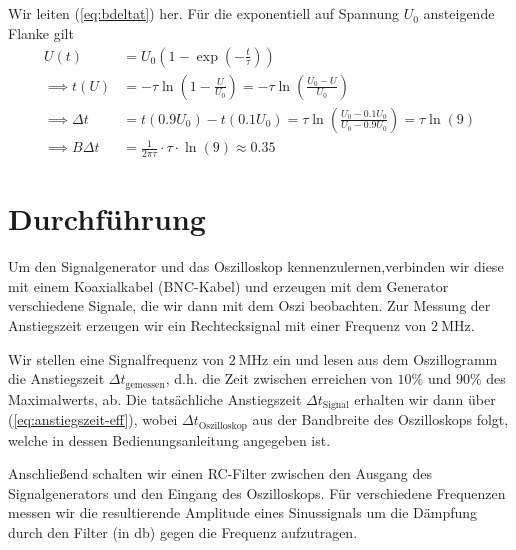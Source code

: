 \documentclass{article}
\begin{document}
\subsection{}
Wir leiten (\ref{eq:bdeltat}) her. Für die exponentiell auf Spannung $U_0$ ansteigende Flanke gilt
\begin{align*}
  U(t) &= U_0 \left(1 - \exp(-\frac{t}{\tau})\right) \\
  \implies t(U) &= -\tau \ln\left(1 - \frac{U}{U_0}\right) = -\tau \ln\left(\frac{U_0-U}{U_0}\right) \\
  \implies \Delta t &= t(0.9 U_0) - t(0.1 U_0) = \tau \ln\left(\frac{U_0-0.1U_0}{U_0-0.9U_0}\right) = \tau \ln(9) \\
  \implies B \Delta t &= \frac{1}{2\pi\tau} \cdot \tau \cdot \ln(9) \approx 0.35
\end{align*}


\endgroup
\section{Durchführung}
Um den Signalgenerator und das Oszilloskop kennenzulernen,verbinden wir diese mit einem Koaxialkabel (BNC-Kabel) und erzeugen mit dem Generator verschiedene Signale, die wir dann mit dem Oszi beobachten.
Zur Messung der Anstiegszeit erzeugen wir ein Rechtecksignal mit einer Frequenz von $\SI{2}{\mega\hertz}$.


Wir stellen eine Signalfrequenz von $\SI{2}{\mega\hertz}$ ein
und lesen aus dem Oszillogramm die Anstiegszeit $\Delta t_\text{gemessen}$, d.h. die Zeit zwischen erreichen von $10\%$ und $90\%$
des Maximalwerts, ab. Die tatsächliche Anstiegszeit $\Delta t_\text{Signal}$ erhalten wir dann über (\ref{eq:anstiegszeit-eff}),
wobei $\Delta t_\text{Oszilloskop}$ aus der Bandbreite des Oszilloskops folgt, welche in dessen Bedienungsanleitung angegeben ist.

Anschließend schalten wir einen RC-Filter zwischen den Ausgang des Signalgenerators und den Eingang des Oszilloskops. Für verschiedene
Frequenzen messen wir die resultierende Amplitude eines Sinussignals um die Dämpfung durch den Filter (in \unit{\decibel})
gegen die Frequenz aufzutragen.


\end{document}
